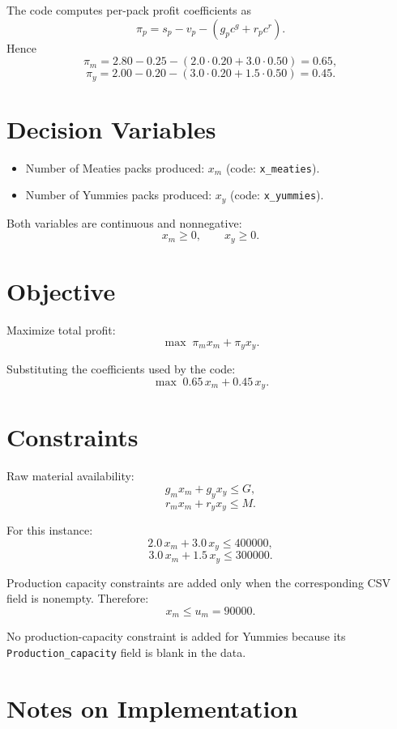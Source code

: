 The code computes per-pack profit coefficients as
\[
\pi_p = s_p - v_p - (g_p c^g + r_p c^r).
\]
Hence
\[
\pi_m = 2.80 - 0.25 - (2.0\cdot 0.20 + 3.0\cdot 0.50) = 0.65,
\]
\[
\pi_y = 2.00 - 0.20 - (3.0\cdot 0.20 + 1.5\cdot 0.50) = 0.45.
\]

\section*{Decision Variables}

\begin{itemize}
    \item Number of Meaties packs produced: \(x_m\) (code: \texttt{x\_meaties}).
    \item Number of Yummies packs produced: \(x_y\) (code: \texttt{x\_yummies}).
\end{itemize}

Both variables are continuous and nonnegative:
\[
x_m \ge 0,\qquad x_y \ge 0.
\]

\section*{Objective}

Maximize total profit:
\[
\max \; \pi_m x_m + \pi_y x_y.
\]

Substituting the coefficients used by the code:
\[
\max \; 0.65\,x_m + 0.45\,x_y.
\]

\section*{Constraints}

Raw material availability:
\[
g_m x_m + g_y x_y \le G,
\]
\[
r_m x_m + r_y x_y \le M.
\]

For this instance:
\[
2.0\,x_m + 3.0\,x_y \le 400000,
\]
\[
3.0\,x_m + 1.5\,x_y \le 300000.
\]

Production capacity constraints are added only when the corresponding CSV field is nonempty. Therefore:
\[
x_m \le u_m = 90000.
\]

No production-capacity constraint is added for Yummies because its \texttt{Production\_capacity} field is blank in the data.

\section*{Notes on Implementation}

